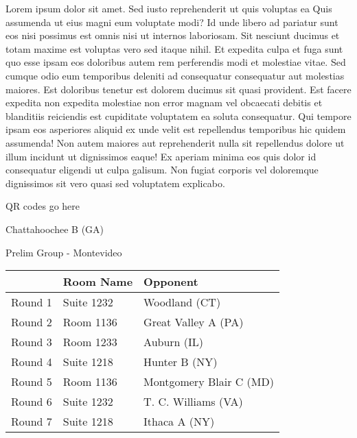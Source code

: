 \documentclass{article}%
\begin{document}
\vspace*{8pt}%
\linebreak%
\newline%
\newline%
Lorem ipsum dolor sit amet. Sed iusto reprehenderit ut quis voluptas ea Quis assumenda ut eius magni eum voluptate modi? Id unde libero ad pariatur sunt eos nisi possimus est omnis nisi ut internos laboriosam. Sit nesciunt ducimus et totam maxime est voluptas vero sed itaque nihil. Et expedita culpa et fuga sunt quo esse ipsam eos doloribus autem rem perferendis modi et molestiae vitae.\newline%
\newline%
Sed cumque odio eum temporibus deleniti ad consequatur consequatur aut molestias maiores. Est doloribus tenetur est dolorem ducimus sit quasi provident. Est facere expedita non expedita molestiae non error magnam vel obcaecati debitis et blanditiis reiciendis est cupiditate voluptatem ea soluta consequatur. Qui tempore ipsam eos asperiores aliquid ex unde velit est repellendus temporibus hic quidem assumenda!\newline%
\newline%
Non autem maiores aut reprehenderit nulla sit repellendus dolore ut illum incidunt ut dignissimos eaque! Ex aperiam minima eos quis dolor id consequatur eligendi ut culpa galisum. Non fugiat corporis vel doloremque dignissimos sit vero quasi sed voluptatem explicabo.\newline%
\newline%
%
\vspace*{30pt}%
\begin{center}%
\begin{Huge}%
QR codes go here%
\end{Huge}%
\end{center}%
\newpage%
%
\begin{center}%
\begin{Huge}%
Chattahoochee B (GA)%
\end{Huge}%
\vspace*{8pt}%
\linebreak%
\begin{Large}%
Prelim Group {-} Montevideo%
\end{Large}%
\end{center}%
\begin{tabularx}{\textwidth}{|c|Y|Y|}%
\hline%
&Room Name&Opponent\\%
\hline%
Round 1&Suite 1232&Woodland (CT)\\%
Round 2&Room 1136&Great Valley A (PA)\\%
Round 3&Room 1233&Auburn (IL)\\%
Round 4&Suite 1218&Hunter B (NY)\\%
Round 5&Room 1136&Montgomery Blair C (MD)\\%
Round 6&Suite 1232&T. C. Williams (VA)\\%
Round 7&Suite 1218&Ithaca A (NY)\\%
\hline%
\end{tabularx}%
\end{document}
